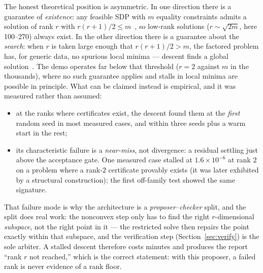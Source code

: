 \documentclass[11pt]{article}
\begin{document}
The honest theoretical position is asymmetric. In one direction there is a
guarantee of \emph{existence}: any feasible SDP with $m$ equality constraints
admits a solution of rank $r$ with $r(r+1)/2\le m$~\cite{pataki}, so
low-rank solutions ($r\sim\sqrt{2m}$, here 100--270) always exist. In the
other direction there is a guarantee about the \emph{search}: when $r$ is
taken large enough that $r(r+1)/2 > m$, the factored problem has, for
generic data, no spurious local minima --- descent finds a global
solution~\cite{boumal}. The demo operates far below that threshold ($r=2$
against $m$ in the thousands), where no such guarantee applies and stalls in
local minima are possible in principle. What can be claimed instead is
empirical, and it was measured rather than assumed:
\begin{itemize}
\item at the ranks where certificates exist, the descent found them at the
      \emph{first} random seed in most measured cases, and within three seeds
      plus a warm start in the rest;
\item its characteristic failure is a \emph{near-miss}, not divergence: a
      residual settling just above the acceptance gate. One measured case
      stalled at $1.6\times10^{-6}$ at rank $2$ on a problem where a rank-$2$
      certificate provably exists (it was later exhibited by a structural
      construction); the first off-family test showed the same signature.
\end{itemize}
That failure mode is why the architecture is a \emph{proposer--checker}
split, and the split does real work: the nonconvex step only has to find the
right $r$-dimensional \emph{subspace}, not the right point in it --- the
restricted solve then repairs the point exactly within that subspace, and the
verification step (Section~\ref{sec:verify}) is the sole arbiter. A stalled
descent therefore costs minutes and produces the report ``rank $r$ not
reached,'' which is the correct statement: with this proposer, a failed rank
is never evidence of a rank floor.
\end{document}
